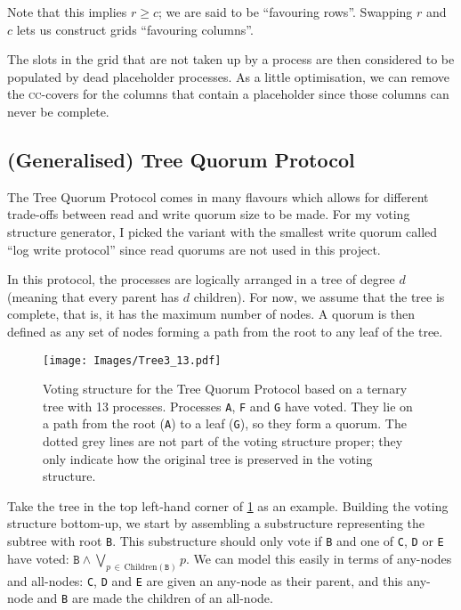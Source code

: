 \documentclass[11pt,chapterprefix=true,toc=bibliography,numbers=noendperiod,
               footnotes=multiple,twoside]{scrreprt}
\begin{document}
Note that this implies \(r \geq c\); we are said to be \enquote{favouring rows}. Swapping \(r\) and \(c\) lets us construct grids \enquote{favouring columns}.

The slots in the grid that are not taken up by a process are then considered to be populated by dead placeholder processes. As a little optimisation, we can remove the \textsc{cc}-covers for the columns that contain a placeholder since those columns can never be complete.

\subsection{(Generalised) Tree Quorum Protocol\label{ssc:tree}}

The Tree Quorum Protocol \autocite{tree} comes in many flavours which allows for different trade-offs between read and write quorum size to be made. For my voting structure generator, I picked the variant with the smallest write quorum called \enquote{log write protocol} since read quorums are not used in this project.

In this protocol, the processes are logically arranged in a tree of degree \(d\) (meaning that every parent has \(d\) children). For now, we assume that the tree is complete, that is, it has the maximum number of nodes. A quorum is then defined as any set of nodes forming a path from the root to any leaf of the tree.

\begin{figure}[h]
    \centering
    \texttt{[image: Images/Tree3\_13.pdf]}
    \caption{Voting structure for the Tree Quorum Protocol based on a ternary tree with 13 processes. Processes \texttt{A}, \texttt{F} and \texttt{G} have voted. They lie on a path from the root (\texttt{A}) to a leaf (\texttt{G}), so they form a quorum. The dotted grey lines are not part of the voting structure proper; they only indicate how the original tree is preserved in the voting structure.}
    \label{fig:grid3_13}
\end{figure}

Take the tree in the top left-hand corner of \cref{fig:grid3_13} as an example. Building the voting structure bottom-up, we start by assembling a substructure representing the subtree with root \texttt{B}. This substructure should only vote if \texttt{B} and one of \texttt{C}, \texttt{D} or \texttt{E} have voted: \( \texttt{B} \wedge \bigvee_{p\,\in\,\text{Children}(\texttt{B})} p \). We can model this easily in terms of any-nodes and all-nodes: \texttt{C}, \texttt{D} and \texttt{E} are given an any-node as their parent, and this any-node and \texttt{B} are made the children of an all-node.
\end{document}
